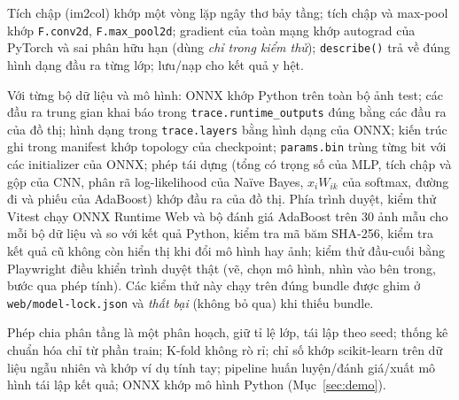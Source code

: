 \begin{description}[leftmargin=0pt,labelindent=0pt,style=unboxed]
\item[CNN.] Tích chập (im2col) khớp một vòng lặp ngây thơ bảy tầng; tích chập và max-pool khớp \texttt{F.conv2d}, \texttt{F.max\_pool2d}; gradient của toàn mạng khớp autograd của PyTorch và sai phân hữu hạn (dùng \emph{chỉ trong kiểm thử}); \texttt{describe()} trả về đúng hình dạng đầu ra từng lớp; lưu/nạp cho kết quả y hệt.
\item[Bundle, hợp đồng vết và trình duyệt.] Với từng bộ dữ liệu và mô hình: ONNX khớp Python trên toàn bộ ảnh test; các đầu ra trung gian khai báo trong \texttt{trace.runtime\_outputs} đúng bằng các đầu ra của đồ thị; hình dạng trong \texttt{trace.layers} bằng hình dạng của ONNX; kiến trúc ghi trong manifest khớp topology của checkpoint; \texttt{params.bin} trùng từng bit với các initializer của ONNX; phép tái dựng (tổng có trọng số của MLP, tích chập và gộp của CNN, phân rã log-likelihood của Naïve Bayes, $x_iW_{ik}$ của softmax, đường đi và phiếu của AdaBoost) khớp đầu ra của đồ thị. Phía trình duyệt, kiểm thử Vitest chạy ONNX Runtime Web và bộ đánh giá AdaBoost trên $30$ ảnh mẫu cho mỗi bộ dữ liệu và so với kết quả Python, kiểm tra mã băm SHA-256, kiểm tra kết quả cũ không còn hiển thị khi đổi mô hình hay ảnh; kiểm thử đầu-cuối bằng Playwright điều khiển trình duyệt thật (vẽ, chọn mô hình, nhìn vào bên trong, bước qua phép tính). Các kiểm thử này chạy trên đúng bundle được ghim ở \texttt{web/model-lock.json} và \emph{thất bại} (không bỏ qua) khi thiếu bundle.
\item[Tiền xử lý, chỉ số, pipeline.] Phép chia phân tầng là một phân hoạch, giữ tỉ lệ lớp, tái lập theo seed; thống kê chuẩn hóa chỉ từ phần train; K-fold không rò rỉ; chỉ số khớp scikit-learn trên dữ liệu ngẫu nhiên và khớp ví dụ tính tay; pipeline huấn luyện/đánh giá/xuất mô hình tái lập kết quả; ONNX khớp mô hình Python (Mục~\ref{sec:demo}).
\end{description}
